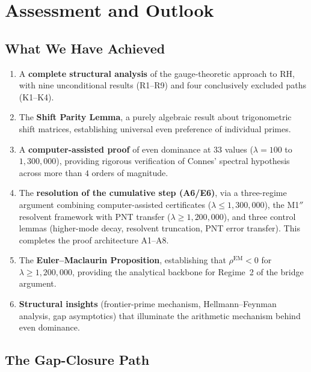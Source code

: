 \documentclass[12pt,a4paper]{article}
\theoremstyle{definition}
\theoremstyle{remark}
\begin{document}
\section{Assessment and Outlook}
\label{sec:outlook}

\subsection{What We Have Achieved}

\begin{enumerate}
  \item A \textbf{complete structural analysis} of the gauge-theoretic approach to RH, with nine unconditional results (R1--R9) and four conclusively excluded paths (K1--K4).

  \item The \textbf{Shift Parity Lemma}, a purely algebraic result about trigonometric shift matrices, establishing universal even preference of individual primes.

  \item A \textbf{computer-assisted proof} of even dominance at $33$ values ($\lambda = 100$ to $1{,}300{,}000$), providing rigorous verification of Connes' spectral hypothesis across more than $4$ orders of magnitude.

  \item The \textbf{resolution of the cumulative step (A6/E6)}, via a three-regime argument combining computer-assisted certificates ($\lambda \leq 1{,}300{,}000$), the M1$''$ resolvent framework with PNT transfer ($\lambda \geq 1{,}200{,}000$), and three control lemmas (higher-mode decay, resolvent truncation, PNT error transfer). This completes the proof architecture A1--A8.

  \item The \textbf{Euler--Maclaurin Proposition}, establishing that $\rho^{\mathrm{EM}} < 0$ for $\lambda \geq 1{,}200{,}000$, providing the analytical backbone for Regime~2 of the bridge argument.

  \item \textbf{Structural insights} (frontier-prime mechanism, Hellmann--Feynman analysis, gap asymptotics) that illuminate the arithmetic mechanism behind even dominance.
\end{enumerate}

\subsection{The Gap-Closure Path}
\label{sec:gap-closure-path}
\end{document}
